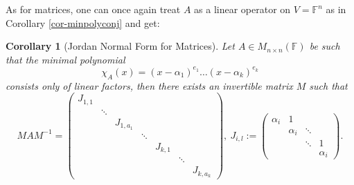 \documentclass[11pt,openany]{book}
\theoremstyle{plain}
\newtheorem{corollary}[corollary]{Corollary}
\theoremstyle{definition}
\theoremstyle{remark}
\begin{document}
As for matrices, one can once again treat $A$ as a linear operator on $V = \mathbb{F}^n$ as in Corollary \ref{cor-minpolyconj} and get:
\begin{corollary}[Jordan Normal Form for Matrices]
    Let $A \in M_{n \times n}(\mathbb{F})$ be such that the minimal polynomial
$$\chi_A(x) = (x-\alpha_1)^{e_1} \dots (x - \alpha_k)^{e_k}$$
consists only of linear factors, then there exists an invertible matrix $M$ such that
$$MAM^{-1} = \begin{pmatrix} J_{1,1} & & & & & \\
& \ddots & & & & & \\ 
& & J_{1,a_1} & & & & \\
& & & \ddots & & &\\
& & & & J_{k,1} & & \\
& & & & & \ddots & \\
& & & & & & J_{k,a_k}\end{pmatrix},\ J_{i,l} := \begin{pmatrix} \alpha_i & 1 & & \\
 & \alpha_i & \ddots & \\
 &  & \ddots & 1 \\
 &  &  & \alpha_i \end{pmatrix}.
$$
\end{corollary}
\end{document}
